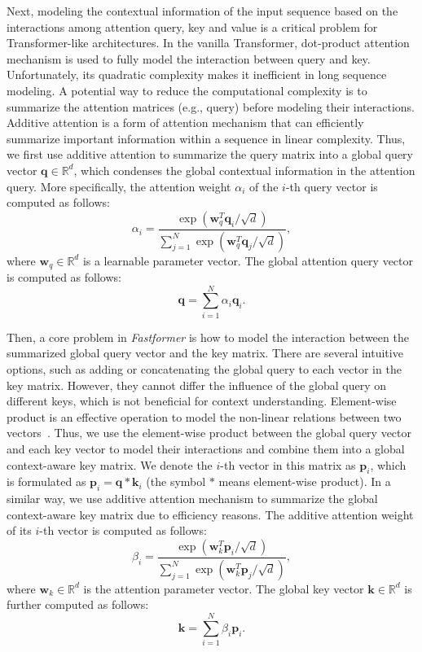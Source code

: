 \documentclass[11pt,a4paper]{article}
\begin{document}
Next, modeling the contextual information of the input sequence based on the interactions among attention query, key and value is a critical problem for Transformer-like architectures.
In the vanilla Transformer, dot-product attention mechanism is used to fully model the interaction between query and key.
Unfortunately, its quadratic complexity makes it inefficient in long sequence modeling.
A potential way to reduce the computational complexity is to summarize the attention matrices (e.g., query) before modeling their interactions.
Additive attention is a form of attention mechanism that can efficiently summarize important information within a sequence in linear complexity.
Thus, we first use  additive attention to summarize the query matrix into a global query vector $\mathbf{q}\in \mathbb{R}^{d}$, which condenses the global contextual information in the attention query.
More specifically, the attention weight $\alpha_i$ of the $i$-th query vector is computed as follows:
\begin{equation}
\alpha_i=\frac{\exp(\mathbf{w}_q^T\mathbf{q}_i/\sqrt{d})}{\sum_{j=1}^N\exp(\mathbf{w}_q^T\mathbf{q}_j/\sqrt{d})},
\end{equation}
where $\mathbf{w}_q\in \mathbb{R}^{d}$ is a learnable parameter vector.
The global attention query vector is computed as follows:
\begin{equation}
\mathbf{q}=\sum_{i=1}^N\alpha_i\mathbf{q}_i.
\end{equation}

Then, a core problem in \textit{Fastformer} is how to model the interaction between the summarized global query vector and the key matrix.
There are several intuitive options, such as adding or concatenating the global query to each vector in the key matrix.
However, they cannot differ the influence of the global query on different keys, which is not beneficial for context understanding.
Element-wise product is an effective operation to model the non-linear relations between two vectors~\cite{wang2017item}.
Thus, we use the element-wise product between the global query vector and each key vector to model their interactions and combine them into a global context-aware key matrix.
We denote the $i$-th vector in this matrix as $\mathbf{p}_i$, which is formulated as $\mathbf{p}_i=\mathbf{q} * \mathbf{k}_i$ (the symbol $*$ means element-wise product).
In a similar way, we use additive attention mechanism to summarize the global context-aware key matrix due to efficiency reasons.
The additive attention weight of its $i$-th vector is computed as follows:
\begin{equation}
\beta_i=\frac{\exp(\mathbf{w}_k^T\mathbf{p}_i/\sqrt{d})}{\sum_{j=1}^N\exp(\mathbf{w}_k^T\mathbf{p}_j/\sqrt{d})},
\end{equation}
where $\mathbf{w}_k\in \mathbb{R}^{d}$ is the attention parameter vector.
The global key vector $\mathbf{k}\in \mathbb{R}^{d}$ is further computed as follows:
\begin{equation}
\mathbf{k}=\sum_{i=1}^N\beta_i\mathbf{p}_i.
\end{equation}
\end{document}
